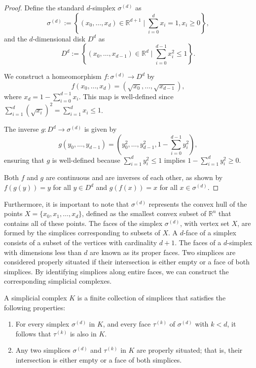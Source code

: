 \begin{proof}
	Define the standard $d$-simplex $\sigma^{(d)}$ as
	\[
		\sigma^{(d)} := \left\{(x_{0}, \ldots, x_{d}) \in \mathbb{R}^{d+1}\mid \sum_{i=0}
		^{d}x_{i} = 1, x_{i} \geq 0\right\},
	\]
	and the $d$-dimensional disk $D^{d}$ as
	\[
		D^{d} := \left\{(x_{0}, \ldots, x_{d-1}) \in \mathbb{R}^{d}\mid \sum_{i=0}^{d-1}x_{i}
		^{2} \leq 1\right\}.
	\]

	We construct a homeomorphism $f: \sigma^{(d)}\rightarrow D^{d}$ by
	\[
		f(x_{0}, \ldots, x_{d}) = (\sqrt{x_{0}}, \ldots, \sqrt{x_{d-1}}),
	\]
	where $x_{d}= 1 - \sum_{i=0}^{d-1}x_{i}$. This map is well-defined since $\sum_{i=1}
	^{d}(\sqrt{x_{i}})^{2} = \sum_{i=1}^{d}x_{i} \leq 1$.

	The inverse $g: D^{d}\rightarrow \sigma^{(d)}$ is given by
	\[
		g(y_{0}, \ldots, y_{d-1}) = (y_{0}^{2}, \ldots, y_{d-1}^{2}, 1 - \sum_{i=0}^{d-1}y_{i}
		^{2}),
	\]
	ensuring that $g$ is well-defined because $\sum_{i=1}^{d}y_{i}^{2} \leq 1$ implies
	$1 - \sum_{i=1}^{d}y_{i}^{2} \geq 0$.

	Both $f$ and $g$ are continuous and are inverses of each other, as shown by
	$f(g(y)) = y$ for all $y \in D^{d}$ and $g(f(x)) = x$ for all
	$x \in \sigma^{(d)}$.
\end{proof}

Furthermore, it is important to note that $\sigma^{(d)}$ represents the convex hull
of the points $X = \{x_{0}, x_{1}, \ldots, x_{d}\}$, defined as the smallest convex
subset of $\mathbb{R}^{n}$ that contains all of these points. The faces of the
simplex $\sigma^{(d)}$, with vertex set $X$, are formed by the simplices
corresponding to subsets of $X$. A $d$-face of a simplex consists of a subset of
the vertices with cardinality $d+1$. The faces of a $d$-simplex with dimensions
less than $d$ are known as its proper faces. Two simplices
are considered properly situated if their intersection is
either empty or a face of both simplices. By identifying simplices along entire
faces, we can construct the corresponding simplicial complexes.

\begin{definition}
	{\cite[\S 2.2]{boissonnat2018geometric}} \label{simplicialcomplex}
	A simplicial complex $K$ is a finite collection of simplices that satisfies the
	following properties:
	\begin{enumerate}
		\item For every simplex $\sigma^{(d)}$ in $K$, and every face $\tau^{(k)}$
			of $\sigma^{(d)}$ with $k < d$, it follows that $\tau^{(k)}$ is also in $K$.

		\item Any two simplices $\sigma^{(d)}$ and $\tau^{(k)}$ in $K$ are properly situated;
			that is, their intersection is either empty or a face of both simplices.
	\end{enumerate}
\end{definition}

